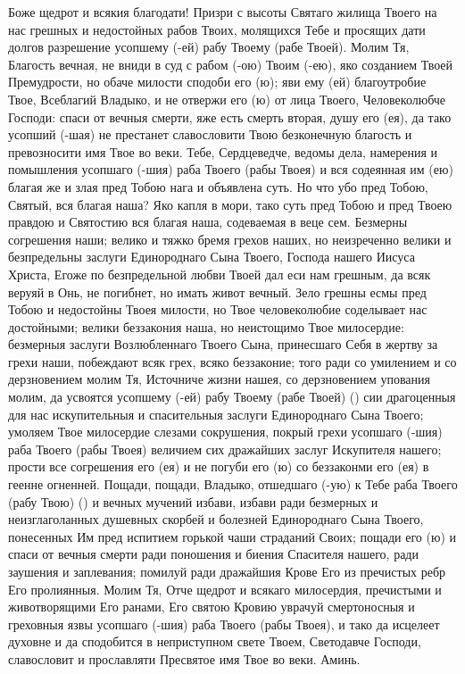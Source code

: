 \begin{mymulticols}
\end{mymulticols}

\mychapterending


\begin{mymulticols}
 


Боже щедрот и всякия благодати! Призри с высоты Святаго жилища Твоего на нас грешных и недостойных рабов Твоих, молящихся Тебе и просящих дати долгов разрешение усопшему (-ей) рабу Твоему (рабе Твоей). Молим Тя, Благость вечная, не вниди в суд с рабом (-ою) Твоим (-ею), яко созданием Твоей Премудрости, но обаче милости сподоби его (ю); яви ему (ей) благоутробие Твое, Всеблагий Владыко, и не отвержи его (ю) от лица Твоего, Человеколюбче Господи: спаси от вечныя смерти, яже есть смерть вторая, душу его (ея), да тако усопший (-шая) не престанет славословити Твою безконечную благость и превозносити имя Твое во веки. Тебе, Сердцеведче, ведомы дела, намерения и помышления усопшаго (-шия) раба Твоего (рабы Твоея) и вся содеянная им (ею) благая же и злая пред Тобою нага и объявлена суть. Но что убо пред Тобою, Святый, вся благая наша? Яко капля в мори, тако суть пред Тобою и пред Твоею правдою и Святостию вся благая наша, содеваемая в веце сем. Безмерны согрешения наши; велико и тяжко бремя грехов наших, но неизреченно велики и безпредельны заслуги Единороднаго Сына Твоего, Господа нашего Иисуса Христа, Егоже по безпредельной любви Твоей дал еси нам грешным, да всяк веруяй в Онь, не погибнет, но имать живот вечный. Зело грешны есмы пред Тобою и недостойны Твоея милости, но Твое человеколюбие соделывает нас достойными; велики беззакония наша, но неистощимо Твое милосердие: безмерныя заслуги Возлюбленнаго Твоего Сына, принесшаго Себя в жертву за грехи наши, побеждают всяк грех, всяко беззаконие; того ради со умилением и со дерзновением молим Тя, Источниче жизни нашея, со дерзновением упования молим, да усвоятся усопшему (-ей) рабу Твоему (рабе Твоей) () сии драгоценныя для нас искупительныя и спасительныя заслуги Единороднаго Сына Твоего; умоляем Твое милосердие слезами сокрушения, покрый грехи усопшаго (-шия) раба Твоего (рабы Твоея) величием сих дражайших заслуг Искупителя нашего; прости все согрешения его (ея) и не погуби его (ю) со беззаконми его (ея) в геенне огненней. Пощади, пощади, Владыко, отшедшаго (-ую) к Тебе раба Твоего (рабу Твою) () и вечных мучений избави, избави ради безмерных и неизглаголанных душевных скорбей и болезней Единороднаго Сына Твоего, понесенных Им пред испитием горькой чаши страданий Своих; пощади его (ю) и спаси от вечныя смерти ради поношения и биения Спасителя нашего, ради заушения и заплевания; помилуй ради дражайшия Крове Его из пречистых ребр Его пролиянныя. Молим Тя, Отче щедрот и всякаго милосердия, пречистыми и животворящими Его ранами, Его святою Кровию уврачуй смертоносныя и греховныя язвы усопшаго (-шия) раба Твоего (рабы Твоея), и тако да исцелеет духовне и да сподобится в неприступном свете Твоем, Светодавче Господи, славословит и прославляти Пресвятое имя Твое во веки. Аминь. 

\end{mymulticols}

